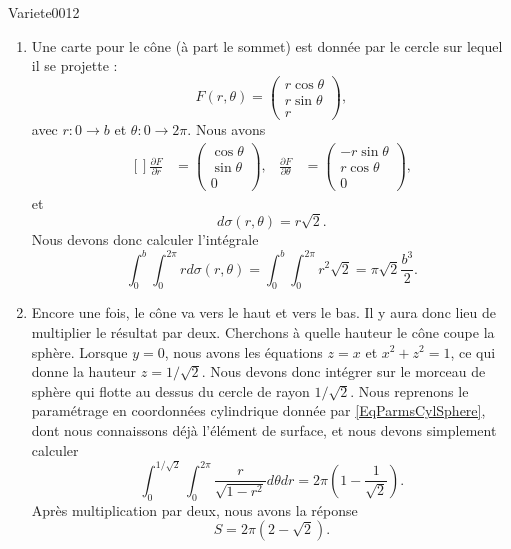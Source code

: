 \begin{corrige}{Variete0012}
\begin{enumerate}
		\item
			Une carte pour le cône (à part le sommet) est donnée par le cercle sur lequel il se projette :
			\begin{equation}
				F(r,\theta)=\begin{pmatrix}
					r\cos\theta	\\ 
					r\sin\theta	\\ 
					r	
				\end{pmatrix},
			\end{equation}
			avec $r\colon 0\to b$ et $\theta\colon 0\to 2\pi$. Nous avons
			\begin{equation}
				\begin{aligned}[]
					\frac{ \partial F }{ \partial r }&=\begin{pmatrix}
						\cos\theta	\\ 
						\sin\theta	\\ 
						0	
					\end{pmatrix},
					&\frac{ \partial F }{ \partial \theta }&=\begin{pmatrix}
						-r\sin\theta	\\ 
						r\cos\theta	\\ 
						0	
					\end{pmatrix},
				\end{aligned}
			\end{equation}
			et 
			\begin{equation}
				d\sigma(r,\theta)=r\sqrt{2}.
			\end{equation}
			Nous devons donc calculer l'intégrale
			\begin{equation}
				\int_0^b\int_0^{2\pi}rd\sigma(r,\theta)=\int_0^b\int_0^{2\pi}r^2\sqrt{2}=\pi\sqrt{2}\frac{ b^3 }{ 2 }.
			\end{equation}
			
		\item
			Encore une fois, le cône va vers le haut et vers le bas. Il y aura donc lieu de multiplier le résultat par deux. Cherchons à quelle hauteur le cône coupe la sphère. Lorsque $y=0$, nous avons les équations $z=x$ et $x^2+z^2=1$, ce qui donne la hauteur $z=1/\sqrt{2}$. Nous devons donc intégrer sur le morceau de sphère qui flotte au dessus du cercle de rayon $1/\sqrt{2}$. Nous reprenons le paramétrage en coordonnées cylindrique donnée par \eqref{EqParmsCylSphere}, dont nous connaissons déjà l'élément de surface, et  nous devons simplement calculer
			\begin{equation}
				\int_0^{1/\sqrt{2}}\int_0^{2\pi}\frac{ r }{ \sqrt{1-r^2} }d\theta dr=2\pi(1-\frac{1}{ \sqrt{2} }).
			\end{equation}
			Après multiplication par deux, nous avons la réponse
			\begin{equation}
				S=2\pi(2-\sqrt{2}).
			\end{equation}
			

\end{enumerate}
\end{corrige}
